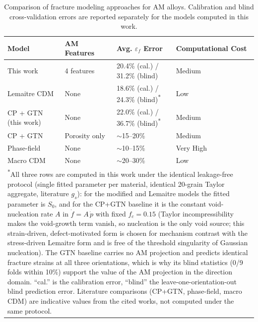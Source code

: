 \documentclass[12pt,a4paper,twocolumn]{article}
\begin{document}
\begin{table}[htbp]
\centering
\caption{Comparison of fracture modeling approaches for AM alloys. Calibration and blind cross-validation errors are reported separately for the models computed in this work.}
\label{tab:model_comparison}
\footnotesize
\setlength{\tabcolsep}{5pt}
\begin{tabular}{p{2.9cm}p{2.3cm}p{3.7cm}p{2.6cm}}
\toprule
\textbf{Model} & \textbf{AM Features} & \textbf{Avg. $\varepsilon_f$ Error} & \textbf{Computational Cost} \\
\midrule
This work       & 4 features     & 20.4\% (cal.) / 31.2\% (blind)  & Medium \\
Lemaitre CDM    & None           & 18.6\% (cal.) / 24.3\% (blind)\textsuperscript{*} & Low \\
CP + GTN (this work) & None        & 22.0\% (cal.) / 36.7\% (blind)\textsuperscript{*} & Medium \\
CP + GTN \cite{zhang2021modeling}  & Porosity only  & $\sim$15--20\% & Medium \\
Phase-field \cite{liu2022phase}    & None           & $\sim$10--15\% & Very High \\
Macro CDM \cite{chen2022damage}    & None           & $\sim$20--30\% & Low \\
\bottomrule
\multicolumn{4}{p{14.5cm}}{\footnotesize \textsuperscript{*}All three rows are computed in this work under the identical leakage-free protocol (single fitted parameter per material, identical 20-grain Taylor aggregate, literature $g_s$): for the modified and Lemaitre models the fitted parameter is $S_0$, and for the CP+GTN baseline it is the constant void-nucleation rate $A$ in $\dot f = A\,\dot p$ with fixed $f_c = 0.15$ (Taylor incompressibility makes the void-growth term vanish, so nucleation is the only void source; this strain-driven, defect-motivated form is chosen for mechanism contrast with the stress-driven Lemaitre form and is free of the threshold singularity of Gaussian nucleation). The GTN baseline carries no AM projection and predicts identical fracture strains at all three orientations, which is why its blind statistics (0/9 folds within 10\%) support the value of the AM projection in the direction domain. ``cal.'' is the calibration error, ``blind'' the leave-one-orientation-out blind prediction error. Literature comparisons (CP+GTN, phase-field, macro CDM) are indicative values from the cited works, not computed under the same protocol.}
\end{tabular}
\end{table}
\end{document}
